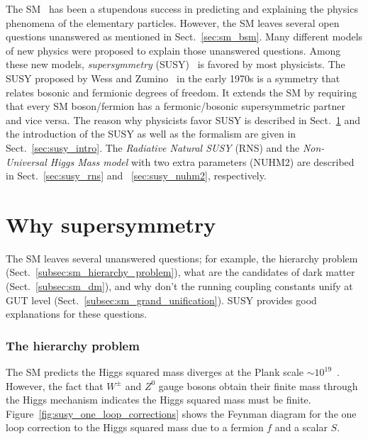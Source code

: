 The SM~\cite{Salam:1968rm, Glashow:1961tr, Weinberg:1967tq, Herrero:1998eq, Cottingham:2007zz} has been a stupendous success in predicting and explaining the physics phenomena of the elementary particles.
However, the SM leaves several open questions unanswered as mentioned in Sect.~\ref{sec:sm_bsm}.
Many different models of new physics were proposed to explain those unanswered questions.
Among these new models, \textit{supersymmetry} (SUSY)~\cite{Wess:1974tw, Lykken:1996xt, Drees:1996ca, Martin:1997ns, Bilal:2001nv, Argyres:2001eva, Peskin:2008nw, Aitchison:2005cf, Shadmi:2017qdk} is favored by most physicists.
The SUSY proposed by Wess and Zumino~\cite{Wess:1974tw} in the early 1970s is a symmetry that relates bosonic and fermionic degrees of freedom.
It extends the SM by requiring that every SM boson/fermion has a fermonic/bosonic supersymmetric partner and vice versa.
The reason why physicists favor SUSY is described in Sect.~\ref{sec:susy_why_susy} and the introduction of the SUSY as well as the formalism are given in Sect.~\ref{sec:susy_intro}.
The \textit{Radiative Natural SUSY} (RNS) and the \textit{Non-Universal Higgs Mass model} with two extra parameters (NUHM2) are described in Sect.~\ref{sec:susy_rns} and ~\ref{sec:susy_nuhm2}, respectively.


\section{Why supersymmetry}
\label{sec:susy_why_susy}
The SM leaves several unanswered questions; for example, the hierarchy problem (Sect.~\ref{subsec:sm_hierarchy_problem}), what are the candidates of dark matter (Sect.~\ref{subsec:sm_dm}), and why don't the running coupling constants unify at GUT level (Sect.~\ref{subsec:sm_grand_unification}).
SUSY provides good explanations for these questions.


\subsubsection{The hierarchy problem}
\label{subsubsec:susy_hierarchy_problem}
The SM predicts the Higgs squared mass diverges at the Plank scale $\sim 10^{19}$~{\GeV}.
However, the fact that $W^{\pm}$ and $Z^{0}$ gauge bosons obtain their finite mass through the Higgs mechanism indicates the Higgs squared mass must be finite.
Figure~\ref{fig:susy_one_loop_corrections} shows the Feynman diagram for the one loop correction to the Higgs squared mass due to a fermion $f$ and a scalar $S$.

